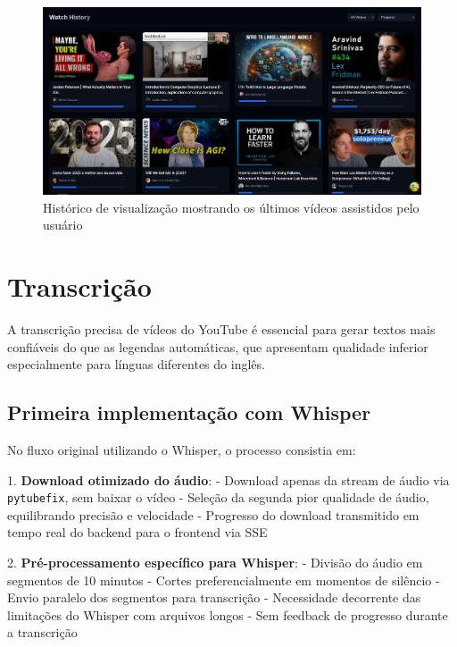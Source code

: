 \documentclass[tcc,capa]{texufpel}
\begin{document}
\begin{figure}[H]
  \centering
  \includegraphics[width=\textwidth,height=0.45\textheight,keepaspectratio]{exemplo-slides/graphics/images/watch history.png}
  \caption{Histórico de visualização mostrando os últimos vídeos assistidos pelo usuário}
  \label{fig:watch_history}
\end{figure}




\section{Transcrição}

A transcrição precisa de vídeos do YouTube é essencial para gerar textos mais confiáveis do que as legendas automáticas, que apresentam qualidade inferior especialmente para línguas diferentes do inglês.

\subsection{Primeira implementação com Whisper}

No fluxo original utilizando o Whisper, o processo consistia em:

1. \textbf{Download otimizado do áudio}:
   - Download apenas da stream de áudio via \texttt{pytubefix}, sem baixar o vídeo
   - Seleção da segunda pior qualidade de áudio, equilibrando precisão e velocidade
   - Progresso do download transmitido em tempo real do backend para o frontend via SSE

2. \textbf{Pré-processamento específico para Whisper}:
   - Divisão do áudio em segmentos de 10 minutos
   - Cortes preferencialmente em momentos de silêncio
   - Envio paralelo dos segmentos para transcrição
   - Necessidade decorrente das limitações do Whisper com arquivos longos
   - Sem feedback de progresso durante a transcrição
\end{document}
